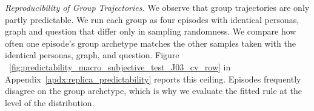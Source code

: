 \textit{Reproducibility of Group Trajectories.} We observe that group trajectories are only partly predictable. We run each group as four episodes with identical personas, graph and question that differ only in sampling randomness. We compare how often one episode's group archetype matches the other samples taken with the identical personas, graph, and question. Figure ~\ref{fig:predictability_macro_subjective_test_J03_cv_row} in Appendix~\ref{apdx:replica_predictability} reports this ceiling. Episodes frequently disagree on the group archetype, which is why we evaluate the fitted rule at the level of the distribution.

